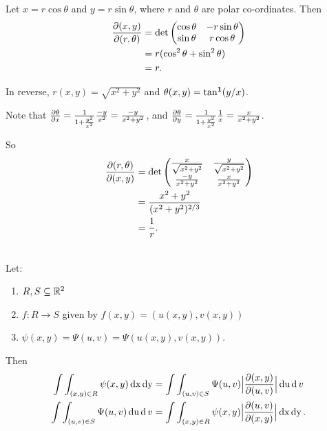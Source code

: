 \begin{example*}
  Let $x = r\cos\theta$ and $y = r\sin\theta$, where $r$ and $\theta$ are polar co-ordinates. Then
  \begin{align*}
    \frac{\partial(x, y)}{\partial(r, \theta)}
    &= \det \begin{pmatrix}\cos\theta & -r\sin\theta\\\sin\theta & r\cos\theta\\ \end{pmatrix}\\
    &= r(\cos^2\theta + \sin^2\theta)\\
    &= r.
  \end{align*}
\end{example*}

\begin{example*}
  In reverse, $r(x,y) = \sqrt{x^2 + y^2}$ and $\theta(x,y) = \tan^{\mathbf 1}(y/x)$.

  Note that $\frac{\partial \theta}{\partial x} = \frac{1}{1 + \frac{y^2}{x^2}}\frac{-y}{x^2} = \frac{-y}{x^2 + y^2}$,
  and $\frac{\partial \theta}{\partial y} = \frac{1}{1 + \frac{y^2}{x^2}}\frac{1}{x} = \frac{x}{x^2 + y^2}$.

  So
  \begin{align*}
    \frac{\partial(r, \theta)}{\partial(x, y)}
    &= \det \begin{pmatrix}\frac{x}{\sqrt{x^2 + y^2}} & \frac{y}{\sqrt{x^2 + y^2}}\\\frac{-y}{x^2 + y^2}       & \frac{x}{x^2 + y^2}\\ \end{pmatrix}\\
    &= \frac{x^2 + y^2}{(x^2+y^2)^{2/3}}\\
    &= \frac{1}{r}.
  \end{align*}
\end{example*}

\begin{theorem*}~\\
  Let:
  \begin{enumerate}
  \item $R, S \subseteq \mathbb{R}^2$
  \item $f:R \to S$ given by $f(x,y) = (u(x,y), v(x,y))$
  \item $\psi(x, y) = \Psi(u, v) = \Psi(u(x,y), v(x, y))$.
  \end{enumerate}
  Then
  \begin{align*}
    \int\int_{(x,y) \in R} \psi(x,y)\operatorname{\text{dx}} \operatorname{\text{dy}}
    &= \int\int_{(u, v) \in S} \Psi(u, v)\Big|\frac{\partial(x, y)}{\partial(u, v)}\Big|\operatorname{\text{du}} \operatorname{\text{d}} v\\
    \int\int_{(u,v) \in S} \Psi(u,v)\operatorname{\text{du}} \operatorname{\text{d}} v
    &= \int\int_{(x, y) \in R} \psi(x, y)\Big|\frac{\partial(u, v)}{\partial(x, y)}\Big|\operatorname{\text{dx}} \operatorname{\text{dy}}.
  \end{align*}
\end{theorem*}

